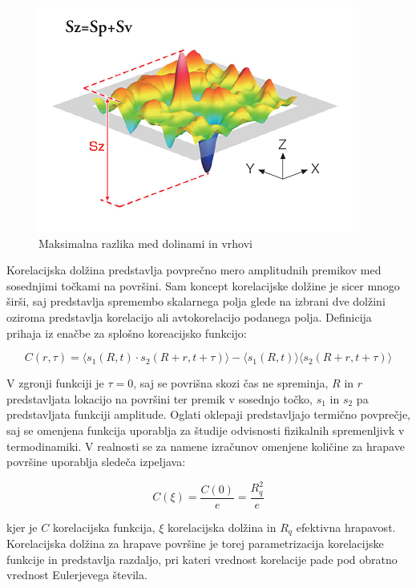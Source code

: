 \documentclass[a4paper,twoside,openright,12pt,slovene]{book}
\begin{document}
\begin{figure}[H]
    \centering
    \includegraphics{Slike/S_z.png}
    \caption{Maksimalna razlika med dolinami in vrhovi \cite{real_SR}}
    \label{fig:Sz}
\end{figure}

Korelacijska dolžina predstavlja povprečno mero amplitudnih premikov med sosednjimi točkami na površini. Sam koncept korelacijske dolžine je sicer mnogo širši, saj predstavlja spremembo skalarnega polja glede na izbrani dve dolžini oziroma predstavlja korelacijo ali avtokorelacijo podanega polja. \cite{FRANCESCHETTI200721}  \cite{physicStackExchange} Definicija prihaja iz enačbe za splošno koreacijsko funkcijo:

\[ C(r, \tau) = \langle s_1(R,t) \cdot s_2(R+r,t+\tau) \rangle - \langle s_1(R,t) \rangle \langle s_2(R+r,t+\tau) \rangle \]

V zgronji funkciji je $\tau = 0$, saj se povrišna skozi čas ne spreminja, $R$ in $r$ predstavljata lokacijo na površini ter premik v sosednjo točko, $s_1$ in $s_2$ pa predstavljata funkciji amplitude. Oglati oklepaji predstavljajo termično povprečje, saj se omenjena funkcija uporablja za študije odvisnosti fizikalnih spremenljivk v termodinamiki. \cite{corelation} V realnosti se za namene izračunov omenjene količine za hrapave površine uporablja sledeča izpeljava:

\[ C(\xi) = \frac{C(0)}{e} = \frac{R_q^2}{e}\]

kjer je $C$ korelacijska funkcija, $\xi$ korelacijska dolžina in $R_q$ efektivna hrapavost. Korelacijska dolžina za hrapave površine je torej parametrizacija korelacijske funkcije in predstavlja razdaljo, pri kateri vrednost korelacije pade pod obratno vrednost Eulerjevega števila. \cite{ACL} \cite{CL}
\end{document}
